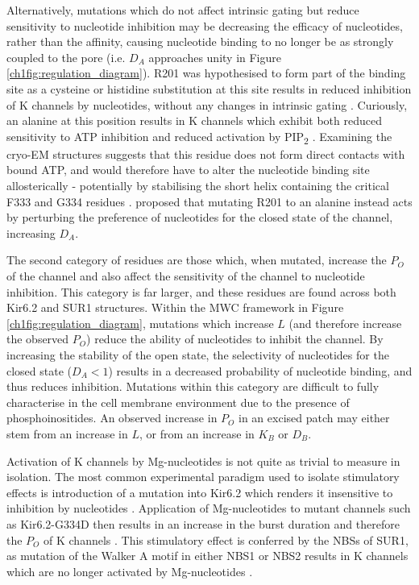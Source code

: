 Alternatively, mutations which do not affect intrinsic gating but reduce sensitivity to nucleotide inhibition may be decreasing the efficacy of nucleotides, rather than the affinity, causing nucleotide binding to no longer be as strongly coupled to the pore (i.e. $D_A$ approaches unity in Figure \ref{ch1fig:regulation_diagram}).
R201 was hypothesised to form part of the binding site as a cysteine \cite{proks_molecular_2004, antcliff_functional_2005} or histidine \cite{tammaro_functional_2006} substitution at this site results in reduced inhibition of K\ATP{} channels by nucleotides, without any changes in intrinsic gating .
Curiously, an alanine at this position results in K\ATP{} channels which exhibit both reduced sensitivity to ATP inhibition and reduced activation by PIP\textsubscript{2} \cite{shyng_structural_2000}.
Examining the cryo-EM structures suggests that this residue does not form direct contacts with bound ATP, and would therefore have to alter the nucleotide binding site allosterically - potentially by stabilising the short helix containing the critical F333 and G334 residues \cite{puljung_cryo-electron_2018}.
\textcite{ribalet_molecular_2003, john_molecular_2003} proposed that mutating R201 to an alanine instead acts by perturbing the preference of nucleotides for the closed state of the channel, increasing $D_A$.

The second category of residues are those which, when mutated, increase the $P_O$ of the channel and also affect the sensitivity of the channel to nucleotide inhibition.
This category is far larger, and these residues are found across both Kir6.2 and SUR1 structures.
Within the MWC framework in Figure \ref{ch1fig:regulation_diagram}, mutations which increase $L$ (and therefore increase the observed $P_O$) reduce the ability of nucleotides to inhibit the channel.
By increasing the stability of the open state, the selectivity of nucleotides for the closed state ($D_A < 1$) results in a decreased probability of nucleotide binding, and thus reduces inhibition.
Mutations within this category are difficult to fully characterise in the cell membrane environment due to the presence of phosphoinositides.
An observed increase in $P_O$ in an excised patch may either stem from an increase in $L$, or from an increase in $K_B$ or $D_B$.

Activation of K\ATP{} channels by Mg-nucleotides is not quite as trivial to measure in isolation.
The most common experimental paradigm used to isolate stimulatory effects is introduction of a mutation into Kir6.2 which renders it insensitive to inhibition by nucleotides \cite{gribble_mgatp_1998-1, proks_activation_2010-1}.
Application of Mg-nucleotides to mutant channels such as Kir6.2-G334D then results in an increase in the burst duration and therefore the $P_O$ of K\ATP{} channels \cite{proks_activation_2010-1}.
This stimulatory effect is conferred by the NBSs of SUR1, as mutation of the Walker A motif in either NBS1 or NBS2 results in K\ATP{} channels which are no longer activated by Mg-nucleotides \cite{gribble_essential_1997,nichols_adenosine_1996}.

